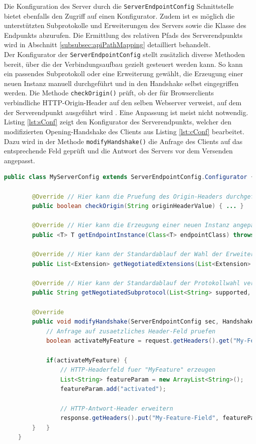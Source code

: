 \documentclass[11pt,a4paper,titlepage]{scrartcl}
\numberwithin{equation}{section}
\begin{document}
\noindent Die Konfiguration des Server durch die \texttt{ServerEndpointConfig} Schnittstelle bietet ebenfalls den Zugriff auf einen Konfigurator. Zudem ist es möglich die unterstützten Subprotokolle und Erweiterungen des Servers sowie die Klasse des Endpunkts abzurufen. Die Ermittlung des relativen Pfads des Serverendpunkts wird in Abschnitt \ref{subsubsec:apiPathMapping} detailliert behandelt. \\

\noindent Der Konfigurator der \texttt{ServerEndpointConfig} stellt zusätzlich diverse Methoden bereit, über die der Verbindungsaufbau gezielt gesteuert werden kann. So kann ein passendes Subprotokoll oder eine Erweiterung gewählt, die Erzeugung einer neuen Instanz manuell durchgeführt und in den Handshake selbst eingegriffen werden. Die Methode \texttt{checkOrigin()} prüft, ob der für Browserclients verbindliche HTTP-Origin-Header auf den selben Webserver verweist, auf dem der Serverendpunkt ausgeführt wird \autocite[107]{coward_java_2014}. Eine Anpassung ist meist nicht notwendig. Listing \ref{lst:sConf} zeigt den Konfigurator des Serverendpunkts, welcher den modifizierten Opening-Handshake des Clients aus Listing \ref{lst:cConf} bearbeitet. Dazu wird in der Methode \texttt{modifyHandshake()} die Anfrage des Clients auf das entsprechende Feld geprüft und die Antwort des Servers vor dem Versenden angepasst. \medskip

\begin{lstlisting}[frame=single, language=Java, caption=Java: ServerEndpointConfig Konfigurationsklasse, label=lst:sConf]
	public class MyServerConfig extends ServerEndpointConfig.Configurator {
	
		@Override // Hier kann die Pruefung des Origin-Headers durchgefuehrt werden
		public boolean checkOrigin(String originHeaderValue) { ... }
		
		@Override // Hier kann die Erzeugung einer neuen Instanz angepasst werden
		public <T> T getEndpointInstance(Class<T> endpointClass) throws InstantiationException { ... }
		
		@Override // Hier kann der Standardablauf der Wahl der Erweiterung veraendert werden
		public List<Extension> getNegotiatedExtensions(List<Extension> installed, List<Extension> requested) { ... }
		
		@Override // Hier kann der Standardablauf der Protokollwahl veraendert werden
		public String getNegotiatedSubprotocol(List<String> supported, List<String> requested) { ... }
		
		@Override
		public void modifyHandshake(ServerEndpointConfig sec, HandshakeRequest request, HandshakeResponse response) {
			// Anfrage auf zusaetzliches Header-Feld pruefen
			boolean activateMyFeature = request.getHeaders().get("My-Feature-Field").get(0).equals("enable");
		
			if(activateMyFeature) {
				// HTTP-Headerfeld fuer "MyFeature" erzeugen
				List<String> featureParam = new ArrayList<String>();
				featureParam.add("activated");
				
				// HTTP-Antwort-Header erweitern
				response.getHeaders().put("My-Feature-Field", featureParam);
		}	}	
	}
\end{lstlisting}
\end{document}
